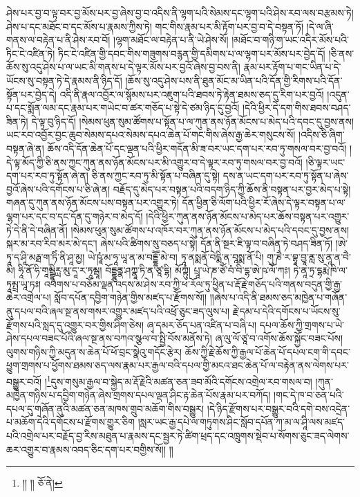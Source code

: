 ཤེས་པར་བྱ་བ་ལྟ་བར་བྱ་མོས་པར་བྱ་ཞེས་བྱ་བ་འདིས་ནི་ལྷག་པའི་སེམས་དང་ལྷག་པའི་ཤེས་རབ་ལས་བརྩམས་ཏེ། ཤེས་པ་དང་མཐོང་བ་དང་མོས་པ་རྣམས་ཀྱིས་ཏེ། གང་གིས་རྣམ་པར་མི་རྟོག་པར་བྱ་བ་དེ་བསྟན་ཏོ། །དེ་ལ་ཞི་གནས་ལ་བརྟེན་པ་ནི་ཤེས་རབ་བོ། །ལྷག་མཐོང་ལ་བརྟེན་པ་ནི་ཡེ་ཤེས་སོ། །མཐོང་བ་གཉི་ག་ཡང་འདིར་མོས་པའི་ཏིང་ངེ་འཛིན་ཏེ། ཏིང་ངེ་འཛིན་གྱི་དབང་གིས་གཟུགས་བརྙན་གྱི་དམིགས་པ་ལ་ལྷག་པར་མོས་པར་བྱེད་དོ། །ཅི་ནས་ཆོས་སུ་འདུ་ཤེས་པ་ལ་ཡང་མི་གནས་པ་དེ་ལྟར་མོས་པར་བྱའོ་ཞེས་བྱ་བས་ནི། རྣམ་པར་རྟོག་པ་གང་ཡིན་པ་དེ་ཡོངས་སུ་བསྟན་ཏེ་དེ་རྣམས་ནི་ཉིད་དོ། །ཆོས་སུ་འདུ་ཤེས་པས་ནི་ཐུན་མོང་མ་ཡིན་པའི་དོན་གྱི་རིགས་པའི་དོན་སྟོན་པར་བྱེད་དེ། འདི་ནི་རྣལ་འབྱོར་ལ་སྙོམས་པར་འཇུག་པའི་ཐབས་ཏེ་རྟེན་ཐམས་ཅད་དུ་རིག་པར་བྱའོ། །འདུན་པ་དང་སྨོན་ལམ་དང་རྣམ་པར་གཡེང་བ་ཚར་གཅོད་པ་སྟེ་དེ་ཙམ་ཉིད་དུ་བྱའོ། །དེའི་ཕྱིར་དེ་དག་གིས་ཐབས་བཤད་ཟིན་ཏེ། དེ་ལྟ་བུ་ཉིད་དོ། །སེམས་ཕུན་སུམ་ཚོགས་པ་སྟོན་པ་ལ་ཀུན་ནས་ཉོན་མོངས་པ་མེད་པའི་དབང་དུ་བྱས་ནས། ཡང་རབ་འབྱོར་བྱང་ཆུབ་སེམས་དཔའ་སེམས་དཔའ་ཆེན་པོ་གང་གིས་ཞེས་རྒྱ་ཆེར་གསུངས་སོ། །འདིས་ཅི་ཞིག་བསྟན་ཞེ་ན། ཆོས་འདི་དོན་ཆེན་པོ་དང་ལྡན་པའི་ཕྱིར་གདོན་མི་ཟ་བར་ཡང་དག་པར་རབ་ཏུ་གསལ་བར་བྱ་བའོ། །དེ་ལྟ་མོད་ཀྱི་ཅི་ནས་ཀྱང་ཀུན་ནས་ཉོན་མོངས་པར་མི་འགྱུར་བ་དེ་ལྟར་རབ་ཏུ་གསལ་བར་བྱ་བའོ། །ཅི་ལྟར་ཡང་དག་པར་རབ་ཏུ་སྟོན་ཞེ་ན། ཅི་ནས་ཀྱང་རབ་ཏུ་མི་སྟོན་པ་བཞིན་དུ་སྟེ། དས་ན་ཡང་དག་པར་རབ་ཏུ་སྟོན་པ་ཞེས་བྱའོ་ཞེས་པའི་དགོངས་པ་ཅི་ཞེ་ན། བརྗོད་དུ་མེད་པར་བསྟན་པའི་བདག་ཉིད་ཀྱི་ཆོས་ནི་བསྟན་པར་བྱར་མེད་པ་སྟེ། གཞན་དུ་ཀུན་ནས་ཉོན་མོངས་པས་བསྟན་པར་འགྱུར་ཏེ། དོན་ཕྱིན་ཅི་ལོག་པའི་ཕྱིར་རོ་ཞེས་དེ་ལྟར་བསྟན་པ་ལ་ལྷག་པར་དང་བ་དང་དོན་དུ་གཉེར་བ་མེད་དོ། །དེའི་ཕྱིར་ཀུན་ནས་ཉོན་མོངས་པ་མེད་པར་ཆོས་བསྟན་པར་འགྱུར་ཏེ་དེ་ནི་དེ་བཞིན་ནོ། །སེམས་ཕུན་སུམ་ཚོགས་པ་འཁོར་བར་ཀུན་ནས་ཉོན་མོངས་པ་མེད་པའི་དབང་དུ་བྱས་ནས། སྐར་མ་རབ་རིབ་མར་མེ་དང་། ཞེས་པའི་ཚིགས་སུ་བཅད་པ་སྟེ། དོན་ནི་སྔར་ཇི་ལྟ་བ་བཞིན་ཏེ་བཤད་ཟིན་ཏོ། །ཨེ་ཏཱ་ད་ཤཱི་མརྠ་ག་ཏིཾ་ནི་ཤཱ་མྱ། ཡེ་ཥཱཾ་མ་ཧཱ་ཡཱ་ན་མ་བདྡྷཽ་མེ་བ། ཏཱ་ནསྨནོ་བེདྨི་ན་བཱསྨ་ནོ་པི། གུ་ཎཻ་ར་བྷཱ་བྱཱ་ནླ་སུ་ནཱ་ན་བཻ་མི། ཧཱི་ནོ་ཧི་གཱམྦྷཱིཪྻ་མུ་དཱ་ར་ཏཱམྦཱ། བོདྡྷུནྣ་ཤཀྣཱ་ཏི་ན་ཙཱ་དྷི། མོཀྟུཾ། པྲཱ་ཡེ་ཎ་ཙོཾ་བཾ་བི་དྷ་ཨེ་ཥ་ལོ་ཀཿ། ཏེ་ནཱ་ཏྲ་དྷརྨེ་ཁི་ལ་ཏཱམྤྲ་ཡཱ་ཏཿ། འཕགས་པ་བཅོམ་ལྡན་འདས་མ་ཤེས་རབ་ཀྱི་ཕ་རོལ་ཏུ་ཕྱིན་པ་རྡོ་རྗེ་གཅོད་པའི་གནས་བདུན་གྱི་རྒྱ་ཆེར་འགྲེལ་པ། སློབ་དཔོན་དབྱིག་གཉེན་གྱིས་མཛད་པ་རྫོགས་སོ།། །།ཞེས་པ་འདི་ནི་ཐམས་ཅད་མཁྱེན་པ་གཞོན་ནུ་དཔལ་བའི་ཞལ་སྔ་ནས་གསར་འགྱུར་མཛད་པའི་འཕྲོ་ཅུང་ཟད་ལུས་པ། རྗེ་དམ་པ་དེའི་དགོངས་པ་ཡོངས་སུ་རྫོགས་པའི་སླད་དུ་འགྱུར་བར་གྱིས་ཤིག་ཅེས། ཞྭ་དམར་ཅོད་པན་འཛིན་པ་བཞི་པ། དཔལ་ཆོས་ཀྱི་གྲགས་པ་ཡེ་ཤེས་དཔལ་བཟང་པོའི་ཞལ་སྔ་ནས་བཀའ་སྩལ་བ་སྤྱི་བོས་མནོས་ཏེ། ཞ་ལུ་ལོ་ཙཱ་བ་འགོས་ཆོས་སྐྱོང་བཟང་པོས། ལུགས་གཉིས་ཀྱི་མདུན་ས་ཆེན་པོ་ཕོ་བྲང་སྣེའུ་གདོང་རྩེར། ཆོས་ཀྱི་རྗེ་ཆོས་ཀྱི་རྒྱལ་པོ་ཆེན་པོ་དཔལ་ངག་གི་དབང་ཕྱུག་གྲགས་པ་ཕྱོགས་ཐམས་ཅད་ལས་རྣམ་པར་རྒྱལ་བའི་དཔལ་གྱི་མངའ་ཐང་ཆེན་པོ་ལ་བརྟེན་ནས་ལེགས་པར་བསྒྱུར་བའོ། །\footnote{།། །།  ཅོ་ནེ། }དུས་གསུམ་རྒྱལ་བ་སྐྱེད་མ་རྡོ་རྗེའི་མཚན་ཅན་ཟབ་མོའི་དགོངས་འགྲེལ་རབ་གསལ་བ། །ཀུན་མཁྱེན་གཉིས་པ་དབྱིག་གཉེན་ཞེས་གྲགས་དཔལ་ལྡན་ཤིང་རྟ་ཆེན་པོས་རྣམ་པར་བཀོད། །གང་དེ་ཁ་བ་ཅན་པའི་དཔལ་དུ་གཞོན་ནུའི་མཚན་ཅན་མཁས་གྲུབ་མཆོག་གིས་བསྒྱུར། །དེ་ཉིད་རྫོགས་པར་བསྒྱུར་བའི་དགེ་བས་འདྲེན་པ་མཆོག་དེའི་དགོངས་པ་རྫོགས་གྱུར་ཅིག །སླར་ཡང་རྒྱ་དཔེ་ལ་གཏུགས་ཤིང་སློབ་དཔོན་ཀ་མ་ལ་ཤཱི་ལས་མཛད་པའི་འགྲེལ་པར་བརྗོད་བྱ་རིས་མཐུན་པ་རྣམས་དང་སྦྱར་ཏེ་ཚིག་ཕྲད་དང་འཁྲུགས་སྡེབ་པ་སོགས་ཅུང་ཟད་ལེགས་ཆར་འགྱུར་བ་རྣམས་འབད་ཅིང་དག་པར་བགྱིས་སོ།། །།